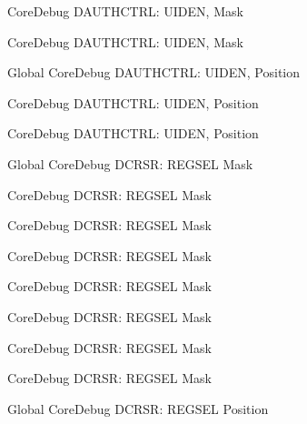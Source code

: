 \begin{DoxyRefList}
\label{deprecated__deprecated000531}%
%
Core\+Debug DAUTHCTRL\+: UIDEN, Mask 

\label{deprecated__deprecated000080}%
%
Core\+Debug DAUTHCTRL\+: UIDEN, Mask  
\item[Global \doxylink{group___c_m_s_i_s___s_c_b_gab9cb997565a842f5eb9365bd58d7cda2}{Core\+Debug\+\_\+\+DAUTHCTRL\+\_\+\+UIDEN\+\_\+\+Pos} ]\label{deprecated__deprecated000632}%
%
Core\+Debug DAUTHCTRL\+: UIDEN, Position 

\label{deprecated__deprecated000079}%
%
Core\+Debug DAUTHCTRL\+: UIDEN, Position 

\label{deprecated__deprecated000530}%
%
Core\+Debug DAUTHCTRL\+: UIDEN, Position  
\item[Global \doxylink{group___c_m_s_i_s___core_debug_ga17cafbd72b55030219ce5609baa7c01d}{Core\+Debug\+\_\+\+DCRSR\+\_\+\+REGSEL\+\_\+\+Msk} ]\label{deprecated__deprecated000044}%
%
Core\+Debug DCRSR\+: REGSEL Mask 

\label{deprecated__deprecated000597}%
%
Core\+Debug DCRSR\+: REGSEL Mask 

\label{deprecated__deprecated000330}%
%
Core\+Debug DCRSR\+: REGSEL Mask 

\label{deprecated__deprecated000271}%
%
Core\+Debug DCRSR\+: REGSEL Mask 

\label{deprecated__deprecated000495}%
%
Core\+Debug DCRSR\+: REGSEL Mask 

\label{deprecated__deprecated000406}%
%
Core\+Debug DCRSR\+: REGSEL Mask 

\label{deprecated__deprecated000132}%
%
Core\+Debug DCRSR\+: REGSEL Mask 

\label{deprecated__deprecated000188}%
%
Core\+Debug DCRSR\+: REGSEL Mask  
\item[Global \doxylink{group___c_m_s_i_s___core_debug_ga52182c8a9f63a52470244c0bc2064f7b}{Core\+Debug\+\_\+\+DCRSR\+\_\+\+REGSEL\+\_\+\+Pos} ]\label{deprecated__deprecated000494}%
%
Core\+Debug DCRSR\+: REGSEL Position 


\end{DoxyRefList}
